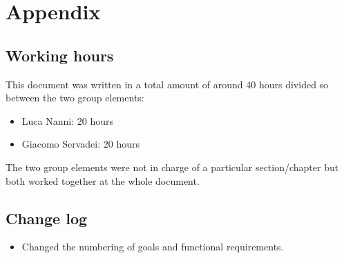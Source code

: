 \chapter{Appendix}



\section{Working hours}
This document was written in a total amount of around 40 hours divided so between the two group elements:
\begin{itemize}
\item Luca Nanni: 20 hours
\item Giacomo Servadei: 20 hours
\end{itemize}
The two group elements were not in charge of a particular section/chapter but both worked together at the whole document.

\section{Change log}
\begin{itemize}
	\item Changed the numbering of goals and functional requirements.
\end{itemize}